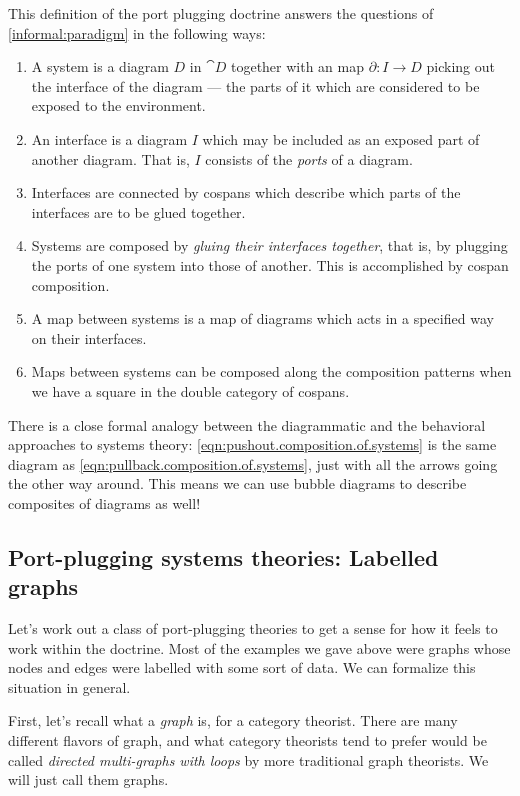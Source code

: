 \documentclass[DynamicalBook]{subfiles}
\begin{document}
  This definition of the port plugging doctrine answers the questions of \cref{informal:paradigm} in the following ways:
  \begin{enumerate}
          \item A system is a diagram $D$ in $\cat{D}$ together with an map $\partial : I \to D$ picking out the interface of the diagram --- the parts of it which are considered to be exposed to the environment.
          \item An interface is a diagram $I$ which may be included as an exposed part of another diagram. That is, $I$ consists of the \emph{ports} of a diagram.
          \item Interfaces are connected by cospans which describe which parts of the interfaces are to be glued together.
          \item Systems are composed by \emph{gluing their interfaces together}, that is, by plugging the ports of one system into those of another. This is accomplished by cospan composition.
          \item A map between systems is a map of diagrams which acts in a specified way on their interfaces.
          \item Maps between systems can be composed along the composition patterns when we have a square in the double category of cospans.
  \end{enumerate}

There is a close formal analogy between the diagrammatic and the behavioral approaches to systems theory: \cref{eqn:pushout.composition.of.systems} is the same diagram as \cref{eqn:pullback.composition.of.systems}, just with all the arrows going the other way around. This means we can use bubble diagrams to describe composites of diagrams as well!

\subsection{Port-plugging systems theories: Labelled graphs}

Let's work out a class of port-plugging theories to get a sense for how it feels to work within the doctrine. Most of the examples we gave above were graphs whose nodes and edges were labelled with some sort of data. We can formalize this situation in general.

First, let's recall what a \emph{graph} is, for a category theorist. There are many different flavors of graph, and what category theorists tend to prefer would be called \emph{directed multi-graphs with loops} by more traditional graph theorists. We will just call them graphs.
\end{document}

